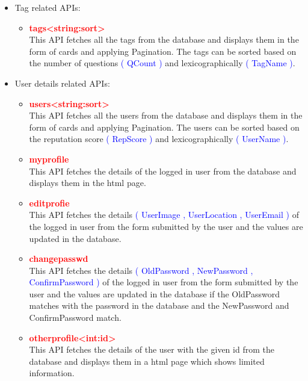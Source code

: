 \documentclass{article}
\begin{document}
\begin{itemize}
    \item Tag related APIs:
    \begin{itemize}
        \item \textcolor{red}{\textbf{\textfractionsolidus tags\textfractionsolidus \textless string:sort\textgreater }} \\ This API fetches all the tags from the database and displays them in the form of cards and applying Pagination. The tags can be sorted based on the number of questions  \textcolor{blue}{( QCount )}  and lexicographically \textcolor{blue}{( TagName )}.
    \end{itemize}
    \item User details related APIs:
    \begin{itemize}
        \item \textcolor{red}{\textbf{\textfractionsolidus users\textfractionsolidus \textless string:sort\textgreater }} \\ This API fetches all the users from the database and displays them in the form of cards and applying Pagination. The users can be sorted based on the reputation score \textcolor{blue}{( RepScore )} and lexicographically \textcolor{blue}{( UserName )}.
        \item \textcolor{red}{\textbf{\textfractionsolidus myprofile}} \\ This API fetches the details of the logged in user from the database and displays them in the html page.
        \item \textcolor{red}{\textbf{\textfractionsolidus editprofie}} \\ This API fetches the details \textcolor{blue}{( UserImage , UserLocation , UserEmail )} of the logged in user from the form submitted by the user and the values are updated in the database. 
        \item \textcolor{red}{\textbf{\textfractionsolidus changepasswd}} \\ This API fetches the details \textcolor{blue}{( OldPassword , NewPassword , ConfirmPassword )} of the logged in user from the form submitted by the user and the values are updated in the database if the OldPassword matches with the password in the database and the NewPassword and ConfirmPassword match.
        \item \textcolor{red}{\textbf{\textfractionsolidus otherprofile\textfractionsolidus \textless int:id\textgreater}} \\ This API fetches the details of the user with the given id from the database and displays them in a html page which shows limited information.

\end{itemize}
\end{itemize}
\end{document}
